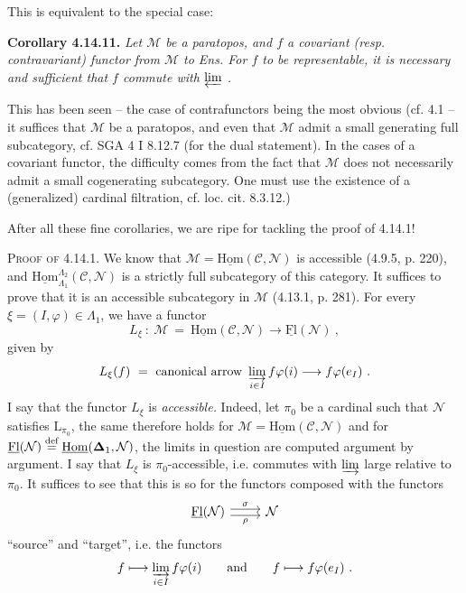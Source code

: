\documentclass[11pt]{article}
\newcommand{\printedpage}[1]{\marginpar{\footnotesize p.~#1}}
\newcommand{\msp}[1]{\marginpar{\footnotesize [#1]}}
\newcommand{\uHom}{\underline{\mathrm{Hom}}}
\newcommand{\uFl}{\underline{\mathrm{Fl}}}
\newcommand{\defeq}{\overset{\textup{def}}{=}}
\begin{document}
\printedpage{144}

\msp{page 380}
This is equivalent to the special case:

\textbf{Corollary 4.14.11.} \textit{Let $\mathcal{M}$ be a paratopos, and $f$ a covariant (resp. contravariant) functor from $\mathcal{M}$ to \textup{Ens}. For $f$ to be representable, it is necessary and sufficient that $f$ commute with $\varprojlim$ .}

This has been seen -- the case of contrafunctors being the most obvious (cf. 4.1 -- it suffices that $\mathcal{M}$ be a paratopos, and even that $\mathcal{M}$ admit a small generating full subcategory, cf. SGA 4 I 8.12.7 (for the dual statement). In the cases of a covariant functor, the difficulty comes from the fact that $\mathcal{M}$ does not necessarily admit a small cogenerating subcategory. One must use the existence of a (generalized) cardinal filtration, cf. loc. cit. 8.3.12.) %

After all these fine corollaries, we are ripe for tackling the proof of 4.14.1!

\msp{page 381}
\textsc{Proof of} 4.14.1. We know that $\mathcal{M} = \uHom(\mathcal{C},\mathcal{N})$ is accessible (4.9.5, p. 220), and $\uHom^{\Lambda_2}_{\Lambda_1}(\mathcal{C},\mathcal{N})$ is a strictly full subcategory of this category. It suffices to prove that it is an accessible subcategory in $\mathcal{M}$ (4.13.1, p. 281). For every $\xi = (I,\varphi) \in \Lambda_1$, we have a functor
\[
L_\xi \ : \ \mathcal{M} \ = \ \uHom(\mathcal{C},\mathcal{N}) \longrightarrow \uFl(\mathcal{N}) \ ,
\]
given by
\[
L_\xi(f) \ = \ \text{canonical arrow } \varinjlim_{i\in I} f\varphi(i) \longrightarrow f\varphi(e_I) \ .
\]
I say that the functor $L_\xi$ is \textit{accessible.} Indeed, let $\pi_0$ be a cardinal such that $\mathcal{N}$ satisfies $\mathrm{L}_{\pi_0}$, the same therefore holds for $\mathcal{M} = \uHom(\mathcal{C},\mathcal{N})$ and for $\uFl(\mathcal{N}) \defeq \uHom(\boldsymbol{\Delta}_1,\mathcal{N})$, the limits in question are computed argument by argument. I say that $L_\xi$ is $\pi_0$-accessible, i.e. commutes with $\varinjlim$ large relative to $\pi_0$. It suffices to see that this is so for the functors composed with the functors
\[
\begin{tikzcd}
\uFl(\mathcal{N}) \arrow[r, shift left, "\sigma"] \arrow[r, shift right, "\rho"'] & \mathcal{N}
\end{tikzcd}
\]
``source'' and ``target'', i.e. the functors
\[
f \longmapsto \varinjlim_{i\in I} f\varphi(i) \qquad \text{and} \qquad f \longmapsto f\varphi(e_I) \ .
\]
\end{document}
